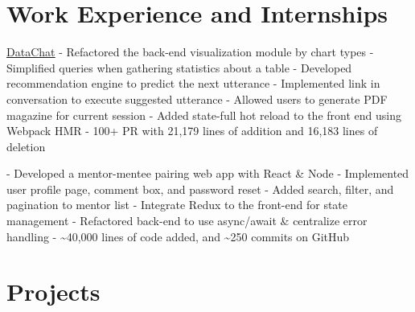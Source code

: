 \documentclass[letterpaper]{twentysecondcv} %
\begin{document}

\section{Work Experience and Internships}

\begin{twenty} %
    {\href{https://datachat.ai/}{\underline{{DataChat}}}}
    {
    - Refactored the back-end visualization module by chart types \newline
    - Simplified queries when gathering statistics about a table\newline
    - Developed recommendation engine to predict the next utterance\newline
    - Implemented link in conversation to execute suggested utterance \newline
    - Allowed users to generate PDF magazine for current session\newline
    - Added state-full hot reload to the front end using Webpack HMR \newline
    - 100+ PR with 21,179 lines of addition and 16,183 lines of deletion \newline
    }
	
	{
	- Developed a mentor-mentee pairing web app with React \& Node\newline
	- Implemented user profile page, comment box, and password reset \newline
	- Added search, filter, and pagination to mentor list \newline
	- Integrate Redux to the front-end for state management \newline
	- Refactored  back-end to use async/await \& centralize error handling \newline
	- \textasciitilde{}40,000 lines of code added, and \textasciitilde{}250 commits on GitHub
	}
\end{twenty}


\section{Projects}
\end{document}

